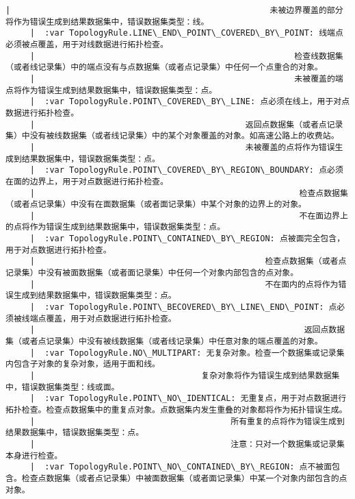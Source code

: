 \documentclass[11pt]{article}
\begin{document}
\begin{Verbatim}[commandchars=\\\{\}]
     |                                                     未被边界覆盖的部分将作为错误生成到结果数据集中，错误数据集类型：线。
     |  :var TopologyRule.LINE\_END\_POINT\_COVERED\_BY\_POINT: 线端点必须被点覆盖，用于对线数据进行拓扑检查。
     |                                                     检查线数据集（或者线记录集）中的端点没有与点数据集（或者点记录集）中任何一个点重合的对象。
     |                                                     未被覆盖的端点将作为错误生成到结果数据集中，错误数据集类型：点。
     |  :var TopologyRule.POINT\_COVERED\_BY\_LINE: 点必须在线上，用于对点数据进行拓扑检查。
     |                                           返回点数据集（或者点记录集）中没有被线数据集（或者线记录集）中的某个对象覆盖的对象。如高速公路上的收费站。
     |                                           未被覆盖的点将作为错误生成到结果数据集中，错误数据集类型：点。
     |  :var TopologyRule.POINT\_COVERED\_BY\_REGION\_BOUNDARY: 点必须在面的边界上，用于对点数据进行拓扑检查。
     |                                                      检查点数据集（或者点记录集）中没有在面数据集（或者面记录集）中某个对象的边界上的对象。
     |                                                      不在面边界上的点将作为错误生成到结果数据集中，错误数据集类型：点。
     |  :var TopologyRule.POINT\_CONTAINED\_BY\_REGION: 点被面完全包含，用于对点数据进行拓扑检查。
     |                                               检查点数据集（或者点记录集）中没有被面数据集（或者面记录集）中任何一个对象内部包含的点对象。
     |                                               不在面内的点将作为错误生成到结果数据集中，错误数据集类型：点。
     |  :var TopologyRule.POINT\_BECOVERED\_BY\_LINE\_END\_POINT: 点必须被线端点覆盖，用于对点数据进行拓扑检查。
     |                                                       返回点数据集（或者点记录集）中没有被线数据集（或者线记录集）中任意对象的端点覆盖的对象。
     |  :var TopologyRule.NO\_MULTIPART: 无复杂对象。检查一个数据集或记录集内包含子对象的复杂对象，适用于面和线。
     |                                  复杂对象将作为错误生成到结果数据集中，错误数据集类型：线或面。
     |  :var TopologyRule.POINT\_NO\_IDENTICAL: 无重复点，用于对点数据进行拓扑检查。检查点数据集中的重复点对象。点数据集内发生重叠的对象都将作为拓扑错误生成。
     |                                        所有重复的点将作为错误生成到结果数据集中，错误数据集类型：点。
     |                                        注意：只对一个数据集或记录集本身进行检查。
     |  :var TopologyRule.POINT\_NO\_CONTAINED\_BY\_REGION: 点不被面包含。检查点数据集（或者点记录集）中被面数据集（或者面记录集）中某一个对象内部包含的点对象。

\end{Verbatim}
\end{document}

